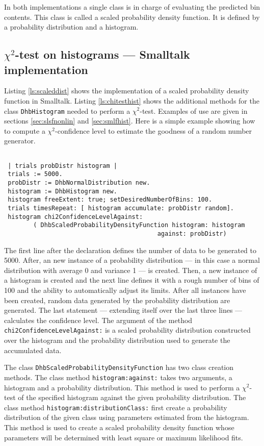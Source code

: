 \documentclass[twoside]{book}
\begin{document}
In both implementations a single class is in charge of evaluating
the predicted bin contents. This class is called a scaled
probability density function. It is defined by a probability
distribution and a histogram.

\subsection{$\chi^2$-test on histograms --- Smalltalk implementation}
 Listing
\ref{ls:scaleddist} shows the implementation of a scaled
probability density function in Smalltalk. Listing
\ref{ls:chitesthist} shows the additional methods for the class
{\tt DhbHistogram} needed to perform a $\chi^2$-test. Examples of
use are given in sections \ref{sec:slsfnonlin} and
\ref{sec:smlfhist}. Here is a simple example showing how to
compute a $\chi^2$-confidence level to estimate the goodness of a
random number generator.
\begin{codeExample}
\label{exs:chitest}
\begin{verbatim}

 | trials probDistr histogram |
 trials := 5000.
 probDistr := DhbNormalDistribution new.
 histogram := DhbHistogram new.
 histogram freeExtent: true; setDesiredNumberOfBins: 100.
 trials timesRepeat: [ histogram accumulate: probDistr random].
 histogram chi2ConfidenceLevelAgainst:
        ( DhbScaledProbabilityDensityFunction histogram: histogram
                                          against: probDistr)
\end{verbatim}
\end{codeExample}
The first line after the declaration defines the number of data to
be generated to 5000. After, an new instance of a probability
distribution --- in this case a normal distribution with average 0
and variance 1 --- is created. Then, a new instance of a histogram
is created and the next line defines it with a rough number of
bins of 100 and the ability to automatically adjust its limits.
After all instances have been created, random data generated by
the probability distribution are generated. The last statement
--- extending itself over the last three lines --- calculates
the confidence level. The argument of the method {\tt
chi2ConfidenceLevelAgainst:} is a scaled probability distribution
constructed over the histogram and the probability distribution
used to generate the accumulated data.

The class {\tt DhbScaledProbabilityDensityFunction} has two class
creation methods. The class method {\tt histogram:against:} takes
two arguments, a histogram and a probability distribution. This
method is used to perform a $\chi^2$-test of the specified
histogram against the given probability distribution. The class
method {\tt histogram:distributionClass:} first create a
probability distribution of the given class using parameters
estimated from the histogram. This method is used to create a
scaled probability density function whose parameters will be
determined with least square or maximum likelihood fits.
\end{document}
